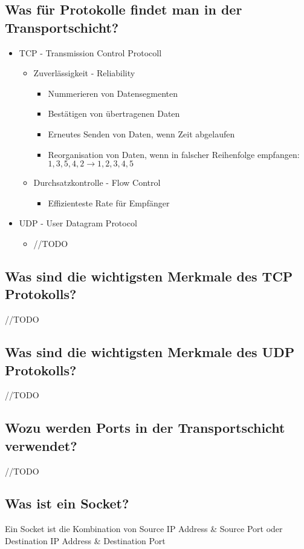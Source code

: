 \subsection*{Was für Protokolle findet man in der Transportschicht?}
\begin{itemize}
    \item TCP - Transmission Control Protocoll
    \begin{itemize}
        \item Zuverlässigkeit - Reliability
        \begin{itemize}
            \item Nummerieren von Datensegmenten
            \item Bestätigen von übertragenen Daten
            \item Erneutes Senden von Daten, wenn Zeit abgelaufen
            \item Reorganisation von Daten, wenn in falscher Reihenfolge empfangen: $1,3,5,4,2 \rightarrow 1,2,3,4,5$
        \end{itemize}
        \item Durchsatzkontrolle - Flow Control
        \begin{itemize}
            \item Effizienteste Rate für Empfänger
        \end{itemize}
    \end{itemize}
    \item UDP - User Datagram Protocol
    \begin{itemize}
        \item //TODO
    \end{itemize}
\end{itemize}
\subsection*{Was sind die wichtigsten Merkmale des TCP Protokolls?}
//TODO
\subsection*{Was sind die wichtigsten Merkmale des UDP Protokolls?}
//TODO
\subsection*{Wozu werden Ports in der Transportschicht verwendet?}
//TODO
\subsection*{Was ist ein Socket?}
Ein Socket ist die Kombination von Source IP Address \& Source Port oder Destination IP Address \& Destination Port
